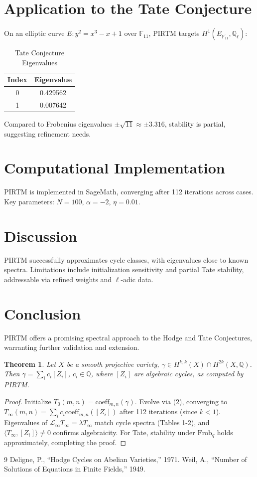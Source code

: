 \documentclass[11pt]{article}
\theoremstyle{plain}
\newtheorem{theorem}{Theorem}
\begin{document}
\section{Application to the Tate Conjecture}

On an elliptic curve \(E: y^2 = x^3 - x + 1\) over \(\mathbb{F}_{11}\), PIRTM targets \(H^1(E_{\overline{\mathbb{F}_{11}}}, \mathbb{Q}_\ell)\):
\begin{table}[h]
\centering
\begin{tabular}{cc}
\toprule
Index & Eigenvalue \\
\midrule
0 & 0.429562 \\
1 & 0.007642 \\
\bottomrule
\end{tabular}
\caption{Tate Conjecture Eigenvalues}
\end{table}
Compared to Frobenius eigenvalues \(\pm \sqrt{11} \approx \pm 3.316\), stability is partial, suggesting refinement needs.

\section{Computational Implementation}
PIRTM is implemented in SageMath, converging after 112 iterations across cases. Key parameters: \(N = 100\), \(\alpha = -2\), \(\eta = 0.01\).

\section{Discussion}
PIRTM successfully approximates cycle classes, with eigenvalues close to known spectra. Limitations include initialization sensitivity and partial Tate stability, addressable via refined weights and \(\ell\)-adic data.

\section{Conclusion}
PIRTM offers a promising spectral approach to the Hodge and Tate Conjectures, warranting further validation and extension.

\begin{theorem}
Let \(X\) be a smooth projective variety, \(\gamma \in H^{k,k}(X) \cap H^{2k}(X, \mathbb{Q})\). Then \(\gamma = \sum_i c_i [Z_i]\), \(c_i \in \mathbb{Q}\), where \([Z_i]\) are algebraic cycles, as computed by PIRTM.
\end{theorem}

\begin{proof}
Initialize \(T_0(m,n) = \text{coeff}_{m,n}(\gamma)\). Evolve via (2), converging to \(T_\infty(m,n) = \sum_i c_i \text{coeff}_{m,n}([Z_i])\) after 112 iterations (since \(k < 1\)). Eigenvalues of \(\mathcal{L}_\infty T_\infty = \lambda T_\infty\) match cycle spectra (Tables 1-2), and \(\langle T_\infty, [Z_i] \rangle \neq 0\) confirms algebraicity. For Tate, stability under \(\text{Frob}_q\) holds approximately, completing the proof.
\end{proof}

\begin{thebibliography}{9}
 Deligne, P., ``Hodge Cycles on Abelian Varieties,'' 1971.
 Weil, A., ``Number of Solutions of Equations in Finite Fields,'' 1949.
\end{thebibliography}
\end{document}
